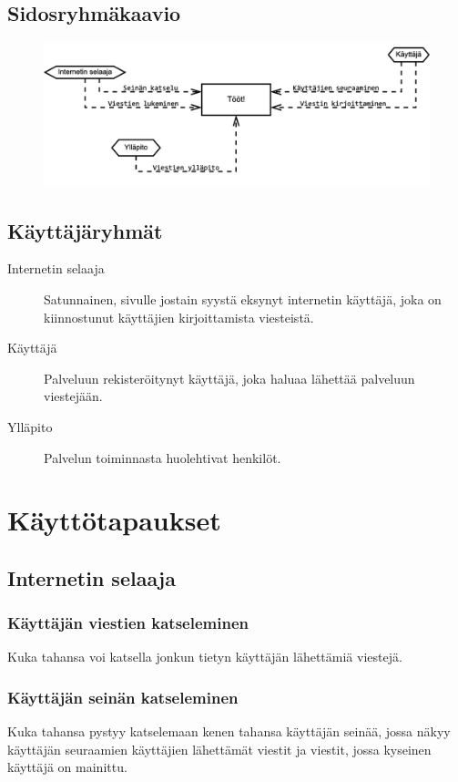 \documentclass{article}
\begin{document}
\subsection{Sidosryhmäkaavio}

\begin{figure}[H]
    \centering
    \includegraphics[width=\textwidth]{sidosryhmat.pdf}
\end{figure}

\subsection{Käyttäjäryhmät}

\begin{description}
    \item[Internetin selaaja] Satunnainen, sivulle jostain syystä eksynyt internetin käyttäjä, joka on kiinnostunut käyttäjien kirjoittamista viesteistä.    
    \item[Käyttäjä] Palveluun rekisteröitynyt käyttäjä, joka haluaa lähettää palveluun viestejään.
    \item[Ylläpito] Palvelun toiminnasta huolehtivat henkilöt.
\end{description}

\section{Käyttötapaukset}

\subsection{Internetin selaaja}

\subsubsection{Käyttäjän viestien katseleminen}
Kuka tahansa voi katsella jonkun tietyn käyttäjän lähettämiä viestejä.

\subsubsection{Käyttäjän seinän katseleminen}
Kuka tahansa pystyy katselemaan kenen tahansa käyttäjän seinää, jossa näkyy käyttäjän seuraamien käyttäjien lähettämät viestit ja viestit, jossa kyseinen käyttäjä on mainittu.
\end{document}
